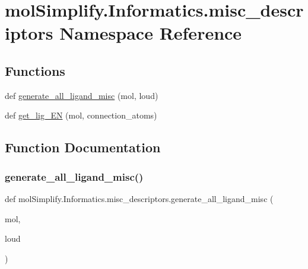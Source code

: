 \hypertarget{namespacemolSimplify_1_1Informatics_1_1misc__descriptors}{}\section{mol\+Simplify.\+Informatics.\+misc\+\_\+descriptors Namespace Reference}
\label{namespacemolSimplify_1_1Informatics_1_1misc__descriptors}
\subsection*{Functions}
\begin{DoxyCompactItemize}
\item 
def \hyperlink{namespacemolSimplify_1_1Informatics_1_1misc__descriptors_ab71a63866f884d92d51286e2668ea28f}{generate\+\_\+all\+\_\+ligand\+\_\+misc} (mol, loud)
\item 
def \hyperlink{namespacemolSimplify_1_1Informatics_1_1misc__descriptors_a4038e31c7265bffcae79b6d5488fad83}{get\+\_\+lig\+\_\+\+EN} (mol, connection\+\_\+atoms)
\end{DoxyCompactItemize}


\subsection{Function Documentation}
\mbox{\label{namespacemolSimplify_1_1Informatics_1_1misc__descriptors_ab71a63866f884d92d51286e2668ea28f}} 
\subsubsection{\texorpdfstring{generate\+\_\+all\+\_\+ligand\+\_\+misc()}{generate\_all\_ligand\_misc()}}
{\footnotesize\ttfamily def mol\+Simplify.\+Informatics.\+misc\+\_\+descriptors.\+generate\+\_\+all\+\_\+ligand\+\_\+misc (\begin{DoxyParamCaption}\item[{}]{mol,  }\item[{}]{loud }\end{DoxyParamCaption})}

